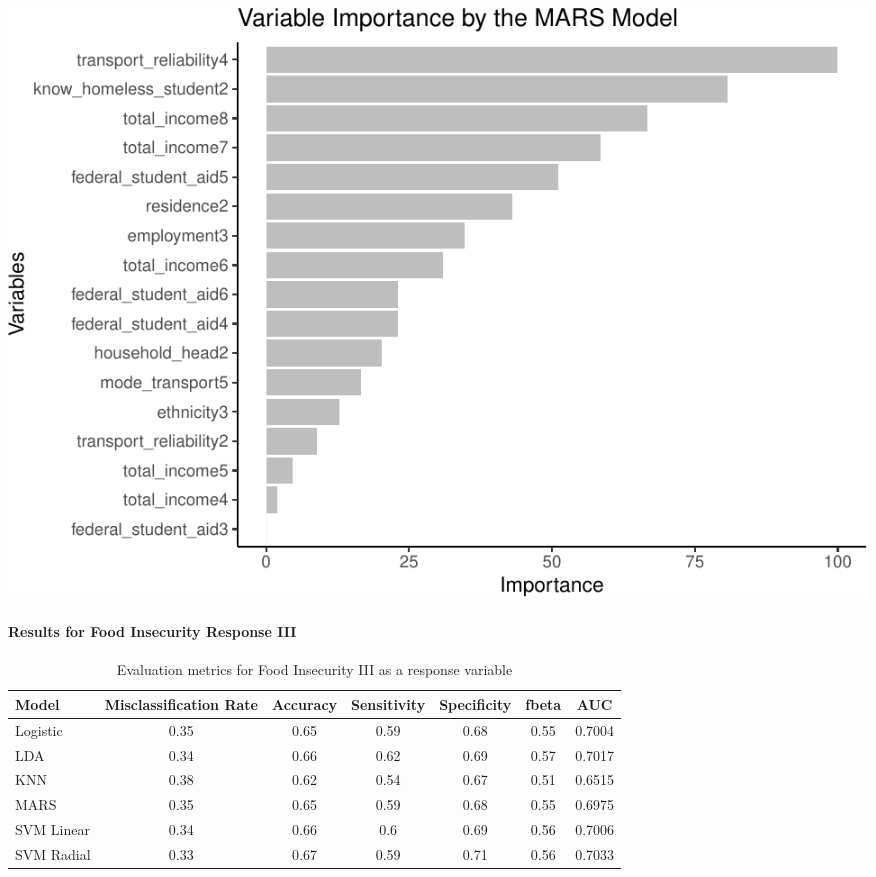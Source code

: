 \documentclass[
  10pt,
]{article}
\begin{document}
\begin{center}\includegraphics{phase2_report_files/figure-latex/unnamed-chunk-20-1} \end{center}

\hypertarget{results-for-food-insecurity-response-iii}{%
\paragraph{Results for Food Insecurity Response III}\label{results-for-food-insecurity-response-iii}}

\begin{table}[H]

\caption{\label{tab:unnamed-chunk-21}Evaluation metrics for Food Insecurity III  as a response variable}
\centering
\fontsize{12}{14}\selectfont
\begin{tabular}[t]{lcccccc}
\toprule
Model & Misclassification Rate & Accuracy & Sensitivity & Specificity & fbeta & AUC\\
\midrule
Logistic & 0.35 & 0.65 & 0.59 & 0.68 & 0.55 & 0.7004\\
LDA & 0.34 & 0.66 & 0.62 & 0.69 & 0.57 & 0.7017\\
KNN & 0.38 & 0.62 & 0.54 & 0.67 & 0.51 & 0.6515\\
MARS & 0.35 & 0.65 & 0.59 & 0.68 & 0.55 & 0.6975\\
SVM Linear & 0.34 & 0.66 & 0.6 & 0.69 & 0.56 & 0.7006\\
SVM Radial & 0.33 & 0.67 & 0.59 & 0.71 & 0.56 & 0.7033\\
\bottomrule
\end{tabular}
\end{table}
\end{document}
